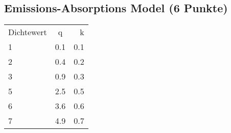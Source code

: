 \newif\ifvimbug
\vimbugfalse

\ifvimbug

\fi


\subsection{Emissions-Absorptions Model (6 Punkte)}
\begin{tabular}{lcr}
  Dichtewert & q & k \\
  1 & 0.1 & 0.1 \\
  2	& 0.4 & 0.2\\
  3	& 0.9 & 0.3\\
  5	& 2.5 & 0.5\\
  6	& 3.6 & 0.6\\
  7	& 4.9 & 0.7\\
 \end{tabular}

